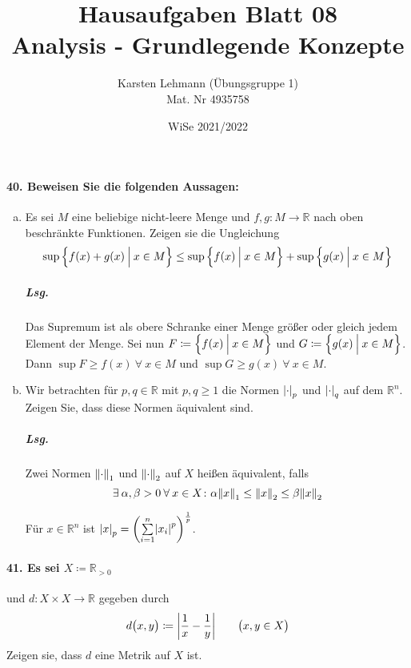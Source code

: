 \documentclass{scrreprt}
\author{Karsten Lehmann (Übungsgruppe 1)\\Mat. Nr 4935758}
\date{WiSe 2021/2022}
\title{Hausaufgaben Blatt 08\\Analysis - Grundlegende Konzepte}
\begin{document}
\paragraph{40. Beweisen Sie die folgenden Aussagen:}
\begin{enumerate}[(a)]
\item Es sei $M$ eine beliebige nicht-leere Menge und
  $f, g \colon M \to \mathbb{R}$ nach oben beschränkte Funktionen.
  Zeigen sie die Ungleichung
  \[
    \sup\qty{f(x) + g(x) \: {\Big |} \: x \in M}
    \leq
    \sup\qty{f(x) \: {\Big |} \: x \in M} +
    \sup\qty{g(x) \: {\Big |} \: x \in M}
  \]

  \subparagraph{Lsg.} Das Supremum ist als obere Schranke einer Menge größer
  oder gleich jedem Element der Menge.
  Sei nun $F \coloneqq \qty{f(x) \: {\Big |} \: x \in M}$ und
  $G \coloneqq \qty{g(x) \: {\Big |} \: x \in M}$.
  Dann $\sup F \geq f(x) \: \forall \: x \in M$ und
  $\sup G \geq g(x) \: \forall \: x \in M$.

\item Wir betrachten für $p, q \in \mathbb{R}$ mit $p, q \geq 1$ die Normen
  $\abs{\cdot}_p$ und $\abs{\cdot}_q$ auf dem $\mathbb{R}^n$.
  Zeigen Sie, dass diese Normen äquivalent sind.

  \subparagraph{Lsg.} Zwei Normen $\norm{\cdot}_1$ und $\norm{\cdot}_2$ auf
  $X$ heißen äquivalent, falls
  \[
    \exists \: \alpha, \beta > 0 \: \forall \: x \in X \colon
    \alpha \norm{x}_1 \leq \norm{x}_2 \leq \beta \norm{x}_2
  \]

  Für $x \in \mathbb{R}^n$ ist $\abs{x}_p =
  \qty(\overset{n}{\underset{i = 1}{\sum}} \abs{x_i}^p)^{\frac{1}{p}}$.
\end{enumerate}

\newpage
\paragraph{41. Es sei $X \coloneqq \mathbb{R}_{> 0}$} und
$d \colon X \times X \to \mathbb{R}$ gegeben durch
\[
  d\qty\big(x, y) \coloneqq \abs{\frac{1}{x} - \frac{1}{y}}
  \qquad \qty\big(x, y \in X)
\]
Zeigen sie, dass $d$ eine Metrik auf $X$ ist.
\end{document}

